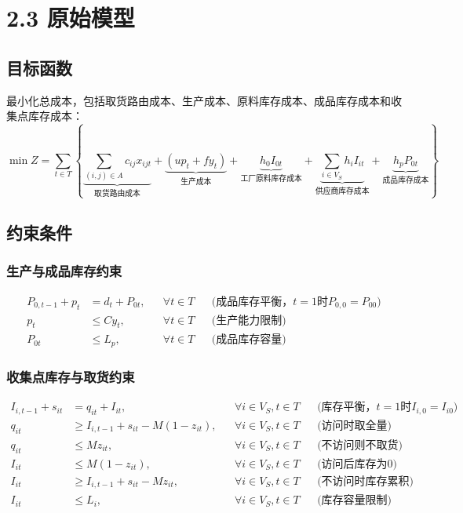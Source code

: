 \documentclass{article}
\begin{document}
\section{2.3 原始模型}

\subsection{目标函数}
最小化总成本，包括取货路由成本、生产成本、原料库存成本、成品库存成本和收集点库存成本：
\begin{equation}
\min Z = \sum_{t \in T} \left\{
\underbrace{\sum_{(i,j) \in A} c_{ij} x_{ijt}}_{\text{取货路由成本}}
+ \underbrace{(u p_t + f y_t)}_{\text{生产成本}}
+ \underbrace{h_0 I_{0t}}_{\text{工厂原料库存成本}}
+ \underbrace{\sum_{i \in V_S} h_i I_{it}}_{\text{供应商库存成本}}
+ \underbrace{h_p P_{0t}}_{\text{成品库存成本}}
\right\}
\end{equation}

\subsection{约束条件}

\subsubsection{生产与成品库存约束}
\vspace{-1.5ex}
\begin{align}
P_{0,t-1} + p_t &= d_t + P_{0t}, && \forall t \in T && \text{(成品库存平衡，$t=1$时$P_{0,0}=P_{00}$)} \\
p_t &\leq C y_t, && \forall t \in T && \text{(生产能力限制)} \\
P_{0t} &\leq L_p, && \forall t \in T && \text{(成品库存容量)}
\end{align}

\subsubsection{收集点库存与取货约束}
\vspace{-1.5ex}
\begin{align}
I_{i,t-1} + s_{it} &= q_{it} + I_{it}, && \forall i \in V_S, t \in T && \text{(库存平衡，$t=1$时$I_{i,0}=I_{i0}$)} \\
q_{it} &\geq I_{i,t-1} + s_{it} - M(1 - z_{it}), && \forall i \in V_S, t \in T && \text{(访问时取全量)} \\
q_{it} &\leq M z_{it}, && \forall i \in V_S, t \in T && \text{(不访问则不取货)} \\
I_{it} &\leq M(1 - z_{it}), && \forall i \in V_S, t \in T && \text{(访问后库存为0)} \\
I_{it} &\geq I_{i,t-1} + s_{it} - M z_{it}, && \forall i \in V_S, t \in T && \text{(不访问时库存累积)} \\
I_{it} &\leq L_i, && \forall i \in V_S, t \in T && \text{(库存容量限制)}
\end{align}
\end{document}
